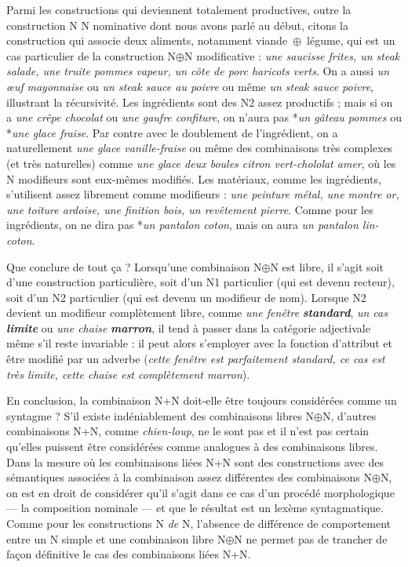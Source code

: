{    Parmi les constructions qui deviennent totalement productives, outre la construction N N nominative dont nous avons parlé au début, citons la construction qui associe deux aliments, notamment viande~\textrm{${\oplus}$}~légume, qui est un cas particulier de la construction N\textrm{${\oplus}$}N modificative : \textit{une saucisse frites, un steak salade, une truite pommes vapeur, un côte de porc haricots verts}. On a aussi \textit{un œuf} \textit{mayonnaise} ou \textit{un steak sauce au poivre} ou même \textit{un steak sauce poivre}, illustrant la récursivité. Les ingrédients sont des N2 assez productifs ; mais si on a \textit{une crêpe chocolat} ou \textit{une gaufre confiture}, on n’aura pas *\textit{un gâteau pommes} ou *\textit{une glace fraise}. Par contre avec le doublement de l’ingrédient, on a naturellement \textit{une glace vanille-fraise} ou même des combinaisons très complexes (et très naturelles) comme \textit{une glace deux boules citron vert-chololat amer}, où les N modifieurs sont eux-mêmes modifiés. Les matériaux, comme les ingrédients, s’utilisent assez librement comme modifieurs : \textit{une peinture métal, une montre or, une toiture ardoise, une finition bois, un revêtement pierre}. Comme pour les ingrédients, on ne dira pas *\textit{un pantalon coton}, mais on aura \textit{un pantalon lin-coton}.

    Que conclure de tout ça ? Lorsqu’une combinaison N\textrm{${\oplus}$}N est libre, il s’agit soit d’une construction particulière, soit d’un N1 particulier (qui est devenu recteur), soit d’un N2 particulier (qui est devenu un modifieur de nom). Lorsque N2 devient un modifieur complètement libre, comme \textit{une fenêtre} \textbf{\textit{standard}}, \textit{un cas} \textbf{\textit{limite}} ou \textit{une chaise} \textbf{\textit{marron}}, il tend à passer dans la catégorie adjectivale même s’il reste invariable : il peut alors s’employer avec la fonction d’attribut et être modifié par un adverbe (\textit{cette fenêtre est parfaitement standard, ce cas est très limite, cette chaise est complètement marron}).

    En conclusion, la combinaison N+N doit-elle être toujours considérées comme un syntagme ? S’il existe indéniablement des combinaisons libres N\textrm{${\oplus}$}N, d’autres combinaisons N+N, comme \textit{chien-loup}, ne le sont pas et il n’est pas certain qu’elles puissent être considérées comme analogues à des combinaisons libres. Dans la mesure où les combinaisons liées N+N sont des constructions avec des sémantiques associées à la combinaison assez différentes des combinaisons N\textrm{${\oplus}$}N, on est en droit de considérer qu’il s’agit dans ce cas d’un procédé morphologique — la composition nominale — et que le résultat est un lexème syntagmatique. Comme pour les constructions N \textit{de} N, l’absence de différence de comportement entre un N simple et une combinaison libre N\textrm{${\oplus}$}N ne permet pas de trancher de façon définitive le cas des combinaisons liées N+N.
}
